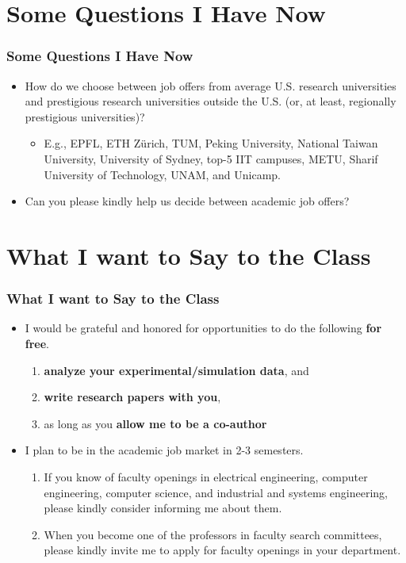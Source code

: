 \documentclass[xcolor={usenames,dvipsnames},hyperref={hyperindex,bookmarks}]{beamer}
\begin{document}
\section{Some Questions I Have Now}

\frame
{
	\frametitle{Some Questions I Have Now}

	\begin{itemize}
	\item How do we choose between job offers from average U.S. research universities and prestigious research universities outside the U.S. (or, at least, regionally prestigious universities)?
		\begin{itemize}
		\item E.g., EPFL, ETH Z{\"{u}}rich, TUM, Peking University, National Taiwan University, University of Sydney, top-5 IIT campuses, METU, Sharif University of Technology, UNAM, and Unicamp.
		\end{itemize}
	\item Can you please kindly help us decide between academic job offers?
	\end{itemize}
}




\section{What I want to Say to the Class}

\frame
{
	\frametitle{What I want to Say to the Class}

	\begin{itemize}
	\item I would be grateful and honored for opportunities to do the following {\bf for free}.
		\begin{enumerate}
		\item {\bf analyze your experimental/simulation data}, and
		\item {\bf write research papers with you},
		\item as long as you {\bf allow me to be a co-author}
		\end{enumerate}
	\item I plan to be in the academic job market in 2-3 semesters. %
		\begin{enumerate} %
		\item If you know of faculty openings in electrical engineering, computer engineering, computer science, and industrial and systems engineering, please kindly consider informing me about them.
		\item When you become one of the professors in faculty search committees, please kindly invite me to apply for faculty openings in your department.
		\end{enumerate}
	\end{itemize}
}
\end{document}
